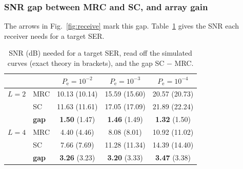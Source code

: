 \documentclass[11pt,a4paper]{article}
\newcommand{\Pe}{P_{\mathrm{e}}}
\begin{document}
\subsubsection{SNR gap between MRC and SC, and array gain}
\label{sec:p2-gap}

The arrows in Fig.~\ref{fig:receive} mark this gap. Table~\ref{tab:p2-gaps} gives the SNR each receiver needs for a target SER.

\begin{table}[htbp]
  \centering\small
  \caption{SNR (dB) needed for a target SER, read off the simulated curves (exact
           theory in brackets), and the gap SC $-$ MRC.}
  \label{tab:p2-gaps}
  \begin{tabular}{@{}llccc@{}}
    \toprule
    & & $\Pe = 10^{-2}$ & $\Pe = 10^{-3}$ & $\Pe = 10^{-4}$ \\
    \midrule
    $L = 2$ & MRC        & 10.13 (10.14) & 15.59 (15.60) & 20.57 (20.73) \\
            & SC         & 11.63 (11.61) & 17.05 (17.09) & 21.89 (22.24) \\
            & \textbf{gap} & \textbf{1.50} (1.47) & \textbf{1.46} (1.49) & \textbf{1.32} (1.50) \\
    \midrule
    $L = 4$ & MRC        & 4.40 (4.46)   & 8.08 (8.01)   & 10.92 (11.02) \\
            & SC         & 7.66 (7.69)   & 11.28 (11.34) & 14.39 (14.40) \\
            & \textbf{gap} & \textbf{3.26} (3.23) & \textbf{3.20} (3.33) & \textbf{3.47} (3.38) \\
    \bottomrule
  \end{tabular}
\end{table}
\end{document}
